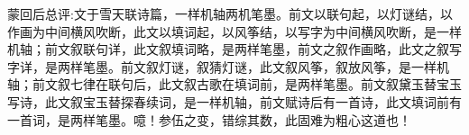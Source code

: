 \begin{parag}
    \begin{note}蒙回后总评:文于雪天联诗篇，一样机轴两机笔墨。前文以联句起，以灯谜结，以作画为中间横风吹断，此文以填词起，以风筝结，以写字为中间横风吹断，是一样机轴；前文叙联句详，此文叙填词略，是两样笔墨，前文之叙作画略，此文之叙写字详，是两样笔墨。前文叙灯谜，叙猜灯谜，此文叙风筝，叙放风筝，是一样机轴；前文叙七律在联句后，此文叙古歌在填词前，是两样笔墨。前文叙黛玉替宝玉写诗，此文叙宝玉替探春续词，是一样机轴，前文赋诗后有一首诗，此文填词前有一首词，是两样笔墨。噫！参伍之变，错综其数，此固难为粗心这道也！\end{note}
\end{parag}
